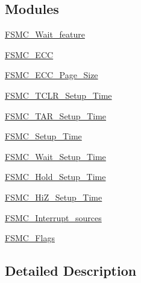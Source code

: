 \subsection*{Modules}
\begin{DoxyCompactItemize}
\item 
\hyperlink{group___f_s_m_c___wait__feature}{F\+S\+M\+C\+\_\+\+Wait\+\_\+feature}
\item 
\hyperlink{group___f_s_m_c___e_c_c}{F\+S\+M\+C\+\_\+\+E\+CC}
\item 
\hyperlink{group___f_s_m_c___e_c_c___page___size}{F\+S\+M\+C\+\_\+\+E\+C\+C\+\_\+\+Page\+\_\+\+Size}
\item 
\hyperlink{group___f_s_m_c___t_c_l_r___setup___time}{F\+S\+M\+C\+\_\+\+T\+C\+L\+R\+\_\+\+Setup\+\_\+\+Time}
\item 
\hyperlink{group___f_s_m_c___t_a_r___setup___time}{F\+S\+M\+C\+\_\+\+T\+A\+R\+\_\+\+Setup\+\_\+\+Time}
\item 
\hyperlink{group___f_s_m_c___setup___time}{F\+S\+M\+C\+\_\+\+Setup\+\_\+\+Time}
\item 
\hyperlink{group___f_s_m_c___wait___setup___time}{F\+S\+M\+C\+\_\+\+Wait\+\_\+\+Setup\+\_\+\+Time}
\item 
\hyperlink{group___f_s_m_c___hold___setup___time}{F\+S\+M\+C\+\_\+\+Hold\+\_\+\+Setup\+\_\+\+Time}
\item 
\hyperlink{group___f_s_m_c___hi_z___setup___time}{F\+S\+M\+C\+\_\+\+Hi\+Z\+\_\+\+Setup\+\_\+\+Time}
\item 
\hyperlink{group___f_s_m_c___interrupt__sources}{F\+S\+M\+C\+\_\+\+Interrupt\+\_\+sources}
\item 
\hyperlink{group___f_s_m_c___flags}{F\+S\+M\+C\+\_\+\+Flags}
\end{DoxyCompactItemize}


\subsection{Detailed Description}
